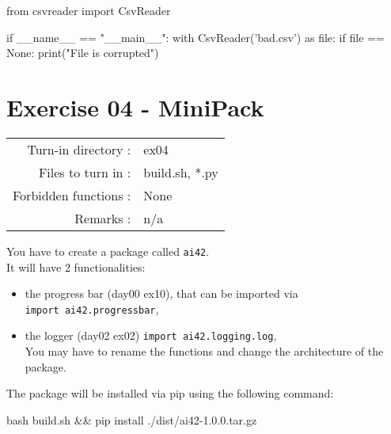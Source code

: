 \documentclass[]{article}
\newenvironment{Shaded}{\begin{snugshade}}{\end{snugshade}}
\newcommand{\BuiltInTok}[1]{\textcolor[rgb]{0.50,0.55,0.55}{#1}}
\newcommand{\ControlFlowTok}[1]{\textcolor[rgb]{0.99,0.74,0.29}{#1}}
\newcommand{\ImportTok}[1]{\textcolor[rgb]{0.15,0.68,0.38}{#1}}
\newcommand{\NormalTok}[1]{\textcolor[rgb]{0.81,0.81,0.76}{#1}}
\newcommand{\OperatorTok}[1]{\textcolor[rgb]{0.81,0.81,0.76}{#1}}
\newcommand{\StringTok}[1]{\textcolor[rgb]{0.96,0.31,0.31}{#1}}
\newcommand{\VariableTok}[1]{\textcolor[rgb]{0.15,0.68,0.68}{#1}}
\begin{document}
\begin{Shaded}
\begin{Highlighting}[]
\ImportTok{from}\NormalTok{ csvreader }\ImportTok{import}\NormalTok{ CsvReader}

\ControlFlowTok{if} \VariableTok{__name__} \OperatorTok{==} \StringTok{"__main__"}\NormalTok{:}
    \ControlFlowTok{with}\NormalTok{ CsvReader(}\StringTok{'bad.csv'}\NormalTok{) }\ImportTok{as} \BuiltInTok{file}\NormalTok{:}
        \ControlFlowTok{if} \BuiltInTok{file} \OperatorTok{==} \VariableTok{None}\NormalTok{:}
            \BuiltInTok{print}\NormalTok{(}\StringTok{"File is corrupted"}\NormalTok{)}
\end{Highlighting}
\end{Shaded}

\clearpage

\hypertarget{exercise-04---minipack-1}{%
\section{Exercise 04 - MiniPack}\label{exercise-04---minipack-1}}

\begin{longtable}[]{@{}rl@{}}
\toprule
\endhead
Turn-in directory : & ex04\tabularnewline
Files to turn in : & build.sh, *.py\tabularnewline
Forbidden functions : & None\tabularnewline
Remarks : & n/a\tabularnewline
\bottomrule
\end{longtable}

You have to create a package called \texttt{ai42}.\\
It will have 2 functionalities:

\begin{itemize}
\item
  the progress bar (day00 ex10), that can be imported via
  \texttt{import\ ai42.progressbar},
\item
  the logger (day02 ex02) \texttt{import\ ai42.logging.log},\\
  You may have to rename the functions and change the architecture of
  the package.
\end{itemize}

The package will be installed via pip using the following command:

\begin{Shaded}
\begin{Highlighting}[]
\NormalTok{bash build.sh && pip install ./dist/ai42-1.0.0.tar.gz}
\end{Highlighting}
\end{Shaded}
\end{document}
